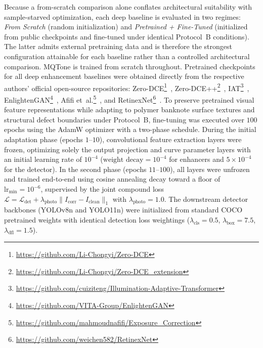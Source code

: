 \documentclass[final,5p,times,twocolumn,authoryear]{elsarticle}
\begin{document}
Because a from-scratch comparison alone conflates architectural suitability with sample-starved optimization, each deep baseline is evaluated in two regimes: \emph{From Scratch} (random initialization) and \emph{Pretrained + Fine-Tuned} (initialized from public checkpoints and fine-tuned under identical Protocol~B conditions). The latter admits external pretraining data and is therefore the strongest configuration attainable for each baseline rather than a controlled architectural comparison. MQTone is trained from scratch throughout. Pretrained checkpoints for all deep enhancement baselines were obtained directly from the respective authors' official open-source repositories: Zero-DCE\footnote{\url{https://github.com/Li-Chongyi/Zero-DCE}}~\cite{Guo2020}, Zero-DCE++\footnote{\url{https://github.com/Li-Chongyi/Zero-DCE_extension}}~\cite{Li2021}, IAT\footnote{\url{https://github.com/cuiziteng/Illumination-Adaptive-Transformer}}~\cite{Cui2022}, EnlightenGAN\footnote{\url{https://github.com/VITA-Group/EnlightenGAN}}~\cite{Jiang2021}, Afifi et~al.\footnote{\url{https://github.com/mahmoudnafifi/Exposure_Correction}}~\cite{Afifi2021}, and RetinexNet\footnote{\url{https://github.com/weichen582/RetinexNet}}~\cite{Wei2018}. To preserve pretrained visual feature representations while adapting to polymer banknote surface textures and structural defect boundaries under Protocol~B, fine-tuning was executed over $100$ epochs using the AdamW optimizer with a two-phase schedule. During the initial adaptation phase (epochs $1$--$10$), convolutional feature extraction layers were frozen, optimizing solely the output projection and curve parameter layers with an initial learning rate of $10^{-4}$ ($\text{weight decay} = 10^{-4}$ for enhancers and $5 \times 10^{-4}$ for the detector). In the second phase (epochs $11$--$100$), all layers were unfrozen and trained end-to-end using cosine annealing decay toward a floor of $\text{lr}_{\text{min}} = 10^{-6}$, supervised by the joint compound loss $\mathcal{L} = \mathcal{L}_{\text{det}} + \lambda_{\text{photo}} \|I_{\text{corr}} - I_{\text{clean}}\|_1$ with $\lambda_{\text{photo}} = 1.0$. The downstream detector backbones (YOLOv8n and YOLO11n) were initialized from standard COCO pretrained weights with identical detection loss weightings ($\lambda_{\text{cls}} = 0.5$, $\lambda_{\text{box}} = 7.5$, $\lambda_{\text{dfl}} = 1.5$).
\end{document}

